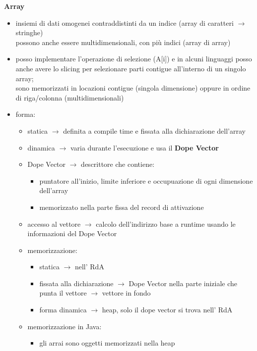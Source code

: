 \documentclass[12pt]{extarticle}
\begin{document}
\begin{flushleft}
\textbf{Array}
\begin{itemize}
  \item insiemi di dati omogenei contraddistinti da un indice (array di caratteri $\rightarrow$ stringhe) \\
        possono anche essere multidimensionali, con più indici (array di array)
  \item posso implementare l'operazione di selezione (A[i]) e in alcuni linguaggi 
        posso anche avere lo slicing per selezionare parti contigue all'interno di un singolo array; \\
        sono memorizzati in locazioni contigue (singola dimensione) oppure in ordine di riga/colonna (multidimensionali)
  \item forma: 
        \begin{itemize}
          \item statica  $\rightarrow$ definita a compile time e fissata alla dichiarazione dell'array
          \item dinamica  $\rightarrow$ varia durante l'esecuzione e usa il \textbf{Dope Vector}
          \item Dope Vector  $\rightarrow$ descrittore che contiene: 
          \begin{itemize}
            \item puntatore all'inizio, limite inferiore e occupuazione di ogni dimensione dell'array
            \item memorizzato nella parte fissa del record di attivazione 
          \end{itemize}
          \item accesso al vettore  $\rightarrow$ calcolo dell'indirizzo base a runtime usando le informazioni del Dope Vector
          \item memorizzazione: 
          \begin{itemize}
            \item statica $\rightarrow$ nell' RdA
            \item fissata alla dichiarazione $\rightarrow$ Dope Vector nella parte iniziale che punta il vettore $\rightarrow$ vettore in fondo
            \item forma dinamica $\rightarrow$ heap, solo il dope vector si trova nell' RdA
          \end{itemize}
          \item memorizzazione in Java:
          \begin{itemize}
            \item gli arrai sono oggetti memorizzati nella heap

\end{itemize}
\end{itemize}
\end{itemize}
\end{flushleft}
\end{document}
